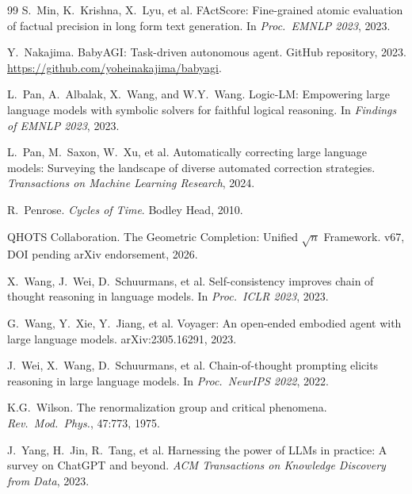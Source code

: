 \documentclass[11pt]{article}
\theoremstyle{definition}
\theoremstyle{remark}
\begin{document}
\begin{thebibliography}{99}
  S.~Min, K.~Krishna, X.~Lyu, et al.
  \newblock FActScore: Fine-grained atomic evaluation of factual precision in
    long form text generation.
  \newblock In \emph{Proc.\ EMNLP 2023}, 2023.

  Y.~Nakajima.
  \newblock BabyAGI: Task-driven autonomous agent.
  \newblock GitHub repository, 2023.
  \newblock \url{https://github.com/yoheinakajima/babyagi}.

  L.~Pan, A.~Albalak, X.~Wang, and W.Y.~Wang.
  \newblock Logic-LM: Empowering large language models with symbolic solvers for
    faithful logical reasoning.
  \newblock In \emph{Findings of EMNLP 2023}, 2023.

  L.~Pan, M.~Saxon, W.~Xu, et al.
  \newblock Automatically correcting large language models: Surveying the
    landscape of diverse automated correction strategies.
  \newblock \emph{Transactions on Machine Learning Research}, 2024.

  R.~Penrose.
  \newblock \emph{Cycles of Time}.
  \newblock Bodley Head, 2010.

  {QHOTS Collaboration}.
  \newblock The Geometric Completion: Unified $\sqrt{n}$ Framework.
  \newblock v67, DOI pending arXiv endorsement, 2026.

  X.~Wang, J.~Wei, D.~Schuurmans, et al.
  \newblock Self-consistency improves chain of thought reasoning in language
    models.
  \newblock In \emph{Proc.\ ICLR 2023}, 2023.

  G.~Wang, Y.~Xie, Y.~Jiang, et al.
  \newblock Voyager: An open-ended embodied agent with large language models.
  \newblock arXiv:2305.16291, 2023.

  J.~Wei, X.~Wang, D.~Schuurmans, et al.
  \newblock Chain-of-thought prompting elicits reasoning in large language models.
  \newblock In \emph{Proc.\ NeurIPS 2022}, 2022.

  K.G.~Wilson.
  \newblock The renormalization group and critical phenomena.
  \newblock \emph{Rev.\ Mod.\ Phys.}, 47:773, 1975.

  J.~Yang, H.~Jin, R.~Tang, et al.
  \newblock Harnessing the power of LLMs in practice: A survey on ChatGPT and
    beyond.
  \newblock \emph{ACM Transactions on Knowledge Discovery from Data}, 2023.

\end{thebibliography}
\end{document}

